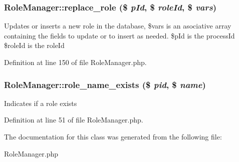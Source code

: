\subsubsection{\setlength{\rightskip}{0pt plus 5cm}Role\-Manager::replace\_\-role (\$ {\em p\-Id}, \$ {\em role\-Id}, \$ {\em vars})}\label{classRoleManager_a9}


Updates or inserts a new role in the database, \$vars is an asociative array containing the fields to update or to insert as needed. \$p\-Id is the process\-Id \$role\-Id is the role\-Id 

Definition at line 150 of file Role\-Manager.php.
\subsubsection{\setlength{\rightskip}{0pt plus 5cm}Role\-Manager::role\_\-name\_\-exists (\$ {\em pid}, \$ {\em name})}\label{classRoleManager_a3}


Indicates if a role exists 

Definition at line 51 of file Role\-Manager.php.

The documentation for this class was generated from the following file:\begin{CompactItemize}
\item 
Role\-Manager.php\end{CompactItemize}
